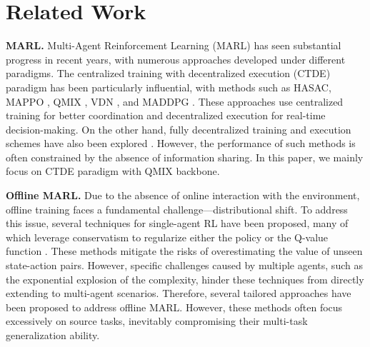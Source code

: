 \section{Related Work}
\textbf{MARL.} Multi-Agent Reinforcement Learning (MARL) has seen substantial progress in recent years, with numerous approaches developed under different paradigms. The centralized training with decentralized execution (CTDE) paradigm \cite{oliehoek2008optimal, matignon2012coordinated, IntroCTDE} has been particularly influential, with methods such as HASAC\cite{liu2024maximum}, MAPPO \cite{yu2021surprising}, QMIX \cite{qmix}, VDN \cite{sunehag2018value}, and MADDPG \cite{lowe2017multi}. These approaches use centralized training for better coordination and decentralized execution for real-time decision-making. On the other hand, fully decentralized training and execution schemes have also been explored \cite{tampuu2017multiagent,ackermann2019reducing,de2020independent}. However, the performance of such methods is often constrained by the absence of information sharing. In this paper, we mainly focus on CTDE paradigm with QMIX backbone.

\textbf{Offline MARL.} 
 Due to the absence of online interaction with the environment, offline training faces a fundamental challenge—distributional shift. To address this issue, several techniques for single-agent RL have been proposed, many of which leverage conservatism to regularize either the policy \cite{td3bc, kostrikov2021offline} or the Q-value function \cite{cql,kostrikov2021offlines,rezaeifar2022offline}. These methods mitigate the risks of overestimating the value of unseen state-action pairs. However, specific challenges caused by multiple agents, such as the exponential explosion of the complexity, hinder these techniques from directly extending to multi-agent scenarios. Therefore, several tailored approaches \cite{jiang2021offline, yang2021believe, omar, li2023beyond, shao2023counterfactual,liu2024offlinemultiagentreinforcementlearning} have been proposed to address offline MARL. However, these methods often focus excessively on source tasks, inevitably compromising their multi-task generalization ability.

